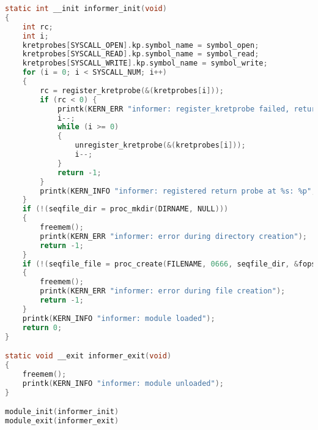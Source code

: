 \begin{appendices}
\begin{lstlisting}[language=C, label=lst:full_code, caption={Код модуля ядра для мониторинга системных вызовов open, read, close}]
static int __init informer_init(void)
{
    int rc;
    int i;
    kretprobes[SYSCALL_OPEN].kp.symbol_name = symbol_open;
    kretprobes[SYSCALL_READ].kp.symbol_name = symbol_read;
    kretprobes[SYSCALL_WRITE].kp.symbol_name = symbol_write;
    for (i = 0; i < SYSCALL_NUM; i++)
    {
        rc = register_kretprobe(&(kretprobes[i]));
        if (rc < 0) {
            printk(KERN_ERR "informer: register_kretprobe failed, returned %d", rc);
            i--;
            while (i >= 0)
            {
                unregister_kretprobe(&(kretprobes[i]));
                i--;
            }
            return -1;
        }
        printk(KERN_INFO "informer: registered return probe at %s: %p", kretprobes[i].kp.symbol_name, kretprobes[i].kp.addr);
    }
    if (!(seqfile_dir = proc_mkdir(DIRNAME, NULL)))
    {
        freemem();
        printk(KERN_ERR "informer: error during directory creation");
        return -1;
    }
    if (!(seqfile_file = proc_create(FILENAME, 0666, seqfile_dir, &fops)))
    {
        freemem();
        printk(KERN_ERR "informer: error during file creation");
        return -1;
    }
    printk(KERN_INFO "informer: module loaded");
    return 0;
}

static void __exit informer_exit(void)
{
    freemem();
    printk(KERN_INFO "informer: module unloaded");
}

module_init(informer_init)
module_exit(informer_exit)
\end{lstlisting}

\end{appendices}